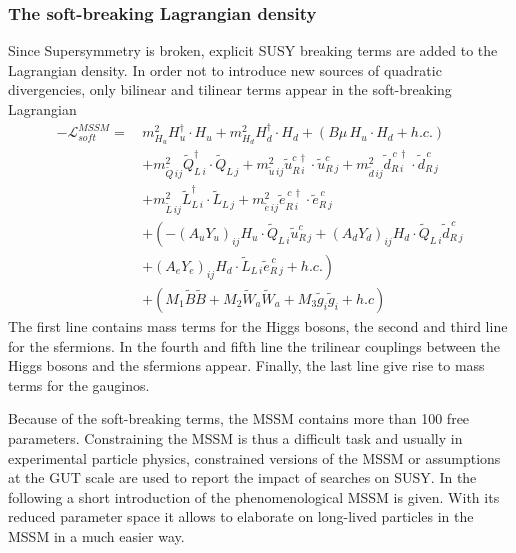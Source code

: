 \subsubsection*{The soft-breaking Lagrangian density}
Since Supersymmetry is broken, explicit SUSY breaking terms are added to the Lagrangian density.
In order not to introduce new sources of quadratic divergencies, only bilinear and tilinear terms appear in the soft-breaking Lagrangian
\begin{equation}
 \begin{split}
  - \mathcal{L}^{MSSM}_{soft} =\,& m_{H_u}^2 H_u^{\dagger} \cdot H_u +m_{H_d}^2 H_d^{\dagger} \cdot H_d + \left(B\mu\, H_u \cdot H_d + h.c.\right) \\
  & + m_{\tilde{Q}\,ij}^2 \tilde{Q}_{L\,i}^{\dagger} \cdot \tilde{Q}_{L\,j}+ m_{\tilde{u}\,ij}^2 \tilde{u}_{R\,i}^{c\,\dagger} \cdot \tilde{u}_{R\,j}^c
+ m_{\tilde{d}\,ij}^2 \tilde{d}_{R\,i}^{\,c\,\dagger} \cdot \tilde{d}_{R\,j}^{\,c}\\
& + m_{\tilde{L}\,ij}^2 \tilde{L}_{L\,i}^{\dagger} \cdot \tilde{L}_{L\,j}+ m_{\tilde{e}\,ij}^2 \tilde{e}_{R\,i}^{\,c\,\dagger} \cdot \tilde{e}_{R\,j}^{\,c}\\
& +\left(- \left( A_u Y_u \right)_{ij} H_u \cdot \tilde{Q}_{L\,i} \tilde{u}_{R\,j}^c +\left( A_d Y_d \right)_{ij} H_d \cdot \tilde{Q}_{L\,i} \tilde{d}_{R\,j}^{\,c} \right.\\
& \left. +\left( A_e Y_e \right)_{ij} H_d \cdot \tilde{L}_{L\,i} \tilde{e}_{R\,j}^{\,c} + h.c. \right)\\
& + \left(M_1 \tilde{B} \tilde{B} + M_2 \tilde{W}_a \tilde{W}_a + M_3 \tilde{g}_i \tilde{g}_i + h.c \right)
 \end{split}
\end{equation}
The first line contains mass terms for the Higgs bosons, the second and third line for the sfermions.
In the fourth and fifth line the trilinear couplings between the Higgs bosons and the sfermions appear.
Finally, the last line give rise to mass terms for the gauginos.

Because of the soft-breaking terms, the MSSM contains more than 100 free parameters.
Constraining the MSSM is thus a difficult task and usually in experimental particle physics, constrained versions of the MSSM or assumptions at the GUT scale are used to report the impact of searches on SUSY. 
In the following a short introduction of the phenomenological MSSM is given.
With its reduced parameter space it allows to elaborate on long-lived particles in the MSSM in a much easier way.

